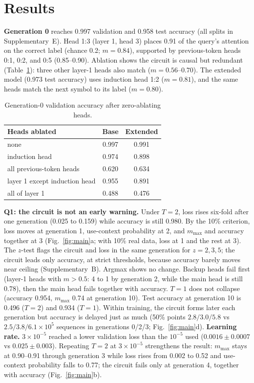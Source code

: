 \documentclass[10pt,letterpaper]{article}
\newcommand{\TestGenZero}{0.958}
\newcommand{\TestTwoTen}{0.496}
\newcommand{\TestOneTen}{0.934}
\newcommand{\TestExtZero}{0.973}
\begin{document}
\section{Results}
\textbf{Generation 0} reaches 0.997 validation and \TestGenZero{} test accuracy (all splits in Supplementary~E). Head 1:3 (layer 1, head 3) places 0.91 of the query's attention on the correct label (chance 0.2; $m{=}0.84$), supported by previous-token heads 0:1, 0:2, and 0:5 (0.85--0.90). Ablation shows the circuit is causal but redundant (Table~\ref{tab:ablation}): three other layer-1 heads also match ($m{=}0.56$--$0.70$). The extended model (\TestExtZero{} test accuracy) uses induction head 1:2 ($m{=}0.81$), and the same heads match the next symbol to its label ($m{=}0.80$).

\setlength{\belowcaptionskip}{-7pt}
\begin{table}[t]
\centering
\captionsetup{font=sf, width=0.95\linewidth, skip=5pt}
\caption{ Generation-0 validation accuracy after zero-ablating heads.}
\small
\begin{tabular}{lcc}
\toprule
Heads ablated & Base & Extended\\
\midrule
none & 0.997 & 0.991\\
induction head & 0.974 & 0.898\\
all previous-token heads & 0.620 & 0.634\\
layer 1 except induction head & 0.955 & 0.891\\
all of layer 1 & 0.488 & 0.476\\
\bottomrule
\end{tabular}
\label{tab:ablation}
\end{table}
\setlength{\belowcaptionskip}{0pt}

\textbf{Q1: the circuit is not an early warning.} Under $T{=}2$, loss rises six-fold after one generation (0.025 to 0.159) while accuracy is still 0.980. By the 10\% criterion, loss moves at generation 1, use-context probability at 2, and $m_{\max}$ and accuracy together at 3 (Fig.~\ref{fig:main}a; with 10\% real data, loss at 1 and the rest at 3). The $z$-test flags the circuit and loss in the same generation for $z{=}2,3,5$; the circuit leads only accuracy, at strict thresholds, because accuracy barely moves near ceiling (Supplementary~B). Argmax shows no change. Backup heads fail first (layer-1 heads with $m{>}0.5$: 4 to 1 by generation 2, while the main head is still 0.78), then the main head fails together with accuracy. $T{=}1$ does not collapse (accuracy 0.954, $m_{\max}$ 0.74 at generation 10). Test accuracy at generation 10 is \TestTwoTen{} ($T{=}2$) and \TestOneTen{} ($T{=}1$). Within training, the circuit forms later each generation but accuracy is delayed just as much (50\% points $2.8/3.0/5.8$ vs $2.5/3.8/6.1\times10^5$ sequences in generations 0/2/3; Fig.~\ref{fig:main}d).
\textbf{Learning rate.} $3\times10^{-5}$ reached a lower validation loss than the $10^{-5}$ used ($0.0016\pm0.0007$ vs $0.025\pm0.003$). Repeating $T{=}2$ at $3\times10^{-5}$ strengthens the result: $m_{\max}$ stays at 0.90--0.91 through generation 3 while loss rises from 0.002 to 0.52 and use-context probability falls to 0.77; the circuit fails only at generation 4, together with accuracy (Fig.~\ref{fig:main}b).
\end{document}
